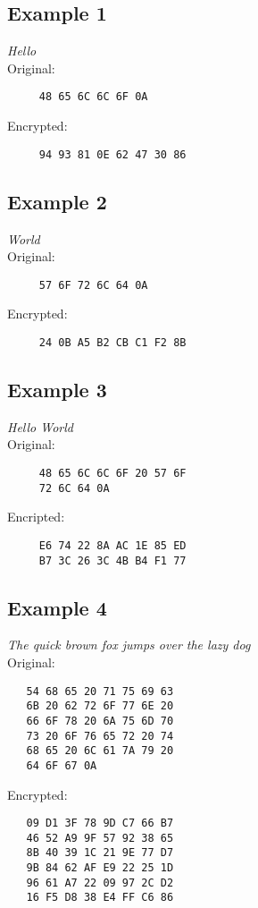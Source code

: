 \documentclass[10pt]{article}
\begin{document}
\begin{multicols}{3}


  \subsection{Example 1}
  \textit{Hello}
  \\\indent Original:
  \begin{verbatim}
     48 65 6C 6C 6F 0A
  \end{verbatim}
  \indent Encrypted:
  \begin{verbatim}
     94 93 81 0E 62 47 30 86
  \end{verbatim}

  \subsection{Example 2}
  \textit{World}
  \\\indent Original:
  \begin{verbatim}
     57 6F 72 6C 64 0A
  \end{verbatim}
  \indent Encrypted:
  \begin{verbatim}
     24 0B A5 B2 CB C1 F2 8B
  \end{verbatim}

  \subsection{Example 3}
  \textit{Hello World}
  \\\indent Original:
  \begin{verbatim}
     48 65 6C 6C 6F 20 57 6F
     72 6C 64 0A
  \end{verbatim}
  \indent Encripted:
  \begin{verbatim}
     E6 74 22 8A AC 1E 85 ED
     B7 3C 26 3C 4B B4 F1 77
  \end{verbatim}

\end{multicols}

\subsection{Example 4}
\textit{The quick brown fox jumps over the lazy dog}
\\\indent Original:
\begin{verbatim}
   54 68 65 20 71 75 69 63
   6B 20 62 72 6F 77 6E 20
   66 6F 78 20 6A 75 6D 70
   73 20 6F 76 65 72 20 74
   68 65 20 6C 61 7A 79 20
   64 6F 67 0A
\end{verbatim}
\indent Encrypted:
\begin{verbatim}
   09 D1 3F 78 9D C7 66 B7
   46 52 A9 9F 57 92 38 65
   8B 40 39 1C 21 9E 77 D7
   9B 84 62 AF E9 22 25 1D
   96 61 A7 22 09 97 2C D2
   16 F5 D8 38 E4 FF C6 86
\end{verbatim}
\end{document}
